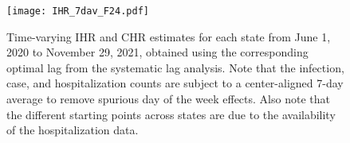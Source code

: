 \begin{figure}[!tb]
\centering
\texttt{[image: IHR\_7dav\_F24.pdf]}
\caption{Time-varying IHR and CHR estimates for each state from June 1, 2020
to November 29, 2021, obtained using the corresponding optimal lag from the
systematic lag analysis. Note that the infection, case, and hospitalization
counts are subject to a center-aligned 7-day average to remove spurious day
of the week effects. Also note that the different starting points across
states are due to the availability of the hospitalization data.}
\label{fig:IHR_7dav}
\end{figure}



